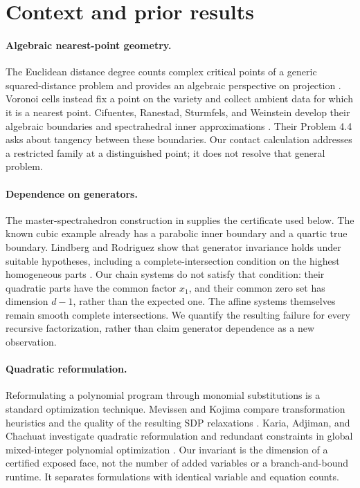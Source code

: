 \documentclass[11pt]{article}
\theoremstyle{definition}\newtheorem{definition}[theorem]{Definition}
\theoremstyle{remark}\newtheorem{remark}[theorem]{Remark}
\begin{document}
\section{Context and prior results}\label{sec:related}
\paragraph{Algebraic nearest-point geometry.}
The Euclidean distance degree counts complex critical points of a generic squared-distance problem and provides an algebraic perspective on projection \cite{eddegree}. Voronoi cells instead fix a point on the variety and collect ambient data for which it is a nearest point. Cifuentes, Ranestad, Sturmfels, and Weinstein develop their algebraic boundaries and spectrahedral inner approximations \cite{voronoi}. Their Problem 4.4 asks about tangency between these boundaries. Our contact calculation addresses a restricted family at a distinguished point; it does not resolve that general problem.

\paragraph{Dependence on generators.}
The master-spectrahedron construction in \cite{chs,voronoi} supplies the certificate used below. The known cubic example already has a parabolic inner boundary and a quartic true boundary. Lindberg and Rodriguez show that generator invariance holds under suitable hypotheses, including a complete-intersection condition on the highest homogeneous parts \cite[Theorem 2.4]{lr}. Our chain systems do not satisfy that condition: their quadratic parts have the common factor $x_1$, and their common zero set has dimension $d-1$, rather than the expected one. The affine systems themselves remain smooth complete intersections. We quantify the resulting failure for every recursive factorization, rather than claim generator dependence as a new observation.

\paragraph{Quadratic reformulation.}
Reformulating a polynomial program through monomial substitutions is a standard optimization technique. Mevissen and Kojima compare transformation heuristics and the quality of the resulting SDP relaxations \cite{mk}. Karia, Adjiman, and Chachuat investigate quadratic reformulation and redundant constraints in global mixed-integer polynomial optimization \cite{kac}. Our invariant is the dimension of a certified exposed face, not the number of added variables or a branch-and-bound runtime. It separates formulations with identical variable and equation counts.
\end{document}

